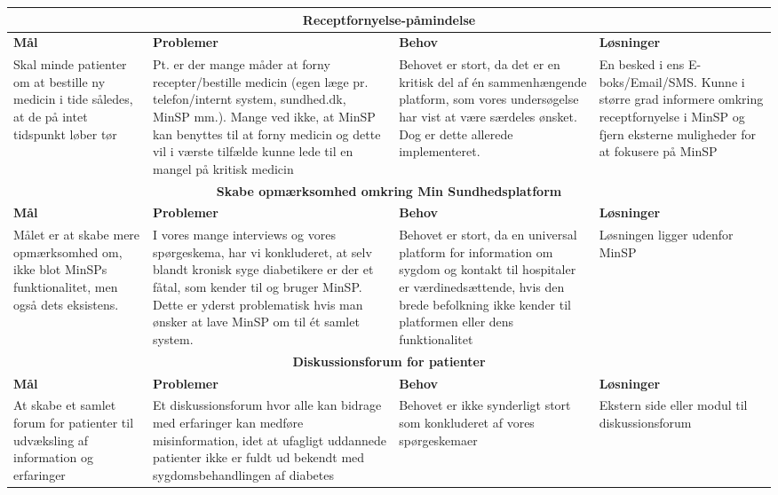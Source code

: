 \newpage

\begin{tabularx}{\textwidth}{|X|X|X|X|}
	\hline
	\multicolumn{4}{|c|}{\textbf{Receptfornyelse-påmindelse}}\\
	\hline
	\textbf{Mål} & \textbf{Problemer} & \textbf{Behov} & \textbf{Løsninger}\\
	\hline
	Skal minde patienter om at bestille ny medicin i tide således, at de på intet tidspunkt løber tør&
	Pt. er der mange måder at forny recepter/bestille medicin (egen læge pr. telefon/internt system, sundhed.dk, MinSP mm.). Mange ved ikke, at MinSP kan benyttes til at forny medicin og dette vil i værste tilfælde kunne lede til en mangel på kritisk medicin&
	Behovet er stort, da det er en kritisk del af én sammenhængende platform, som vores undersøgelse har vist at være særdeles ønsket. Dog er dette allerede implementeret.&
	En besked i ens E-boks/Email/SMS. Kunne i større grad informere omkring receptfornyelse i MinSP og fjern eksterne muligheder for at fokusere på MinSP\\
	\hline
	\multicolumn{4}{|c|}{\textbf{Skabe opmærksomhed omkring Min Sundhedsplatform}}\\
	\hline
	\textbf{Mål} & \textbf{Problemer} & \textbf{Behov} & \textbf{Løsninger}\\
	\hline
	Målet er at skabe mere opmærksomhed om, ikke blot MinSPs funktionalitet, men også dets eksistens.&
	I vores mange interviews og vores spørgeskema, har vi konkluderet, at selv blandt kronisk syge diabetikere er der et fåtal, som kender til og bruger MinSP. Dette er yderst problematisk hvis man ønsker at lave MinSP om til ét samlet system.&
	Behovet er stort, da en universal platform for information om sygdom og kontakt til hospitaler er værdinedsættende, hvis den brede befolkning ikke kender til platformen eller dens funktionalitet&
	Løsningen ligger udenfor MinSP\\
	\hline
	\multicolumn{4}{|c|}{\textbf{Diskussionsforum for patienter}}\\
	\hline
	\textbf{Mål} & \textbf{Problemer} & \textbf{Behov} & \textbf{Løsninger}\\
	\hline
	At skabe et samlet forum for patienter til udvæksling af information og erfaringer&
	Et diskussionsforum hvor alle kan bidrage med erfaringer kan medføre misinformation, idet at ufagligt uddannede patienter ikke er fuldt ud bekendt med sygdomsbehandlingen af diabetes&
	Behovet er ikke synderligt stort som konkluderet af vores spørgeskemaer&
	Ekstern side eller modul til diskussionsforum\\
	\hline
\end{tabularx}

